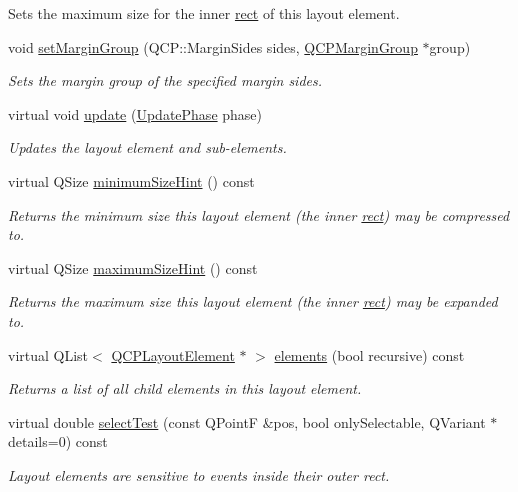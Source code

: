 \begin{DoxyCompactItemize}
\begin{DoxyCompactList}
Sets the maximum size for the inner \hyperlink{classQCPLayoutElement_affdfea003469aac3d0fac5f4e06171bc}{rect} of this layout element. \end{DoxyCompactList}\item 
void \hyperlink{classQCPLayoutElement_a516e56f76b6bc100e8e71d329866847d}{set\+Margin\+Group} (Q\+C\+P\+::\+Margin\+Sides sides, \hyperlink{classQCPMarginGroup}{Q\+C\+P\+Margin\+Group} $\ast$group)
\begin{DoxyCompactList}\small\item\em Sets the margin {\itshape group} of the specified margin {\itshape sides}. \end{DoxyCompactList}\item 
virtual void \hyperlink{classQCPLayoutElement_a929c2ec62e0e0e1d8418eaa802e2af9b}{update} (\hyperlink{classQCPLayoutElement_a0d83360e05735735aaf6d7983c56374d}{Update\+Phase} phase)
\begin{DoxyCompactList}\small\item\em Updates the layout element and sub-\/elements. \end{DoxyCompactList}\item 
virtual Q\+Size \hyperlink{classQCPLayoutElement_aebe14fb71f858c0f98caf8d342a9864a}{minimum\+Size\+Hint} () const 
\begin{DoxyCompactList}\small\item\em Returns the minimum size this layout element (the inner \hyperlink{classQCPLayoutElement_affdfea003469aac3d0fac5f4e06171bc}{rect}) may be compressed to. \end{DoxyCompactList}\item 
virtual Q\+Size \hyperlink{classQCPLayoutElement_adbd3a00fec44c977150c6be7329eb801}{maximum\+Size\+Hint} () const 
\begin{DoxyCompactList}\small\item\em Returns the maximum size this layout element (the inner \hyperlink{classQCPLayoutElement_affdfea003469aac3d0fac5f4e06171bc}{rect}) may be expanded to. \end{DoxyCompactList}\item 
virtual Q\+List$<$ \hyperlink{classQCPLayoutElement}{Q\+C\+P\+Layout\+Element} $\ast$ $>$ \hyperlink{classQCPLayoutElement_a311d60d78e62ef8eaaedb1b6ceb9e788}{elements} (bool recursive) const 
\begin{DoxyCompactList}\small\item\em Returns a list of all child elements in this layout element. \end{DoxyCompactList}\item 
virtual double \hyperlink{classQCPLayoutElement_a9fcf5d0ea19f2c23b2b528bce2c6f095}{select\+Test} (const Q\+Point\+F \&pos, bool only\+Selectable, Q\+Variant $\ast$details=0) const 
\begin{DoxyCompactList}\small\item\em Layout elements are sensitive to events inside their outer rect. \end{DoxyCompactList}\end{DoxyCompactItemize}
